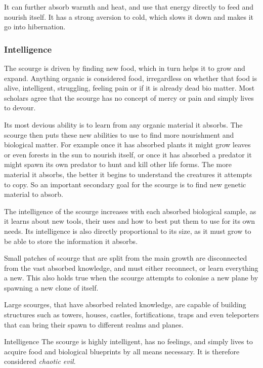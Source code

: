 It can further absorb warmth and heat, and use that energy directly to feed
and nourish itself. It has a strong aversion to cold, which slows it down
and makes it go into hibernation.

\subsubsection{Intelligence}

The scourge is driven by finding new food, which in turn helps it to grow and
expand. Anything organic is considered food, irregardless on whether that food
is alive, intelligent, struggling, feeling pain or if it is already dead bio
matter. Most scholars agree that the scourge has no concept of mercy or pain
and simply lives to devour.

Its most devious ability is to learn from any organic material it absorbs. The
scourge then puts these new abilities to use to find more nourishment and
biological matter. For example once it has absorbed plants it might grow
leaves or even forests in the sun to nourish itself, or once it has absorbed a
predator it might spawn its own predator to hunt and kill other life
forms. The more material it absorbs, the better it begins to understand the
creatures it attempts to copy. So an important secondary goal for the scourge
is to find new genetic material to absorb.

The intelligence of the scourge increases with each absorbed biological
sample, as it learns about new tools, their uses and how to best put them to
use for its own needs. Its intelligence is also directly proportional to its
size, as it must grow to be able to store the information it absorbs.

Small patches of scourge that are split from the main growth are disconnected
from the vast absorbed knowledge, and must either reconnect, or learn
everything a new. This also holds true when the scourge attempts to colonise
a new plane by spawning a new clone of itself.

Large scourges, that have absorbed related knowledge, are capable of building
structures such as towers, houses, castles, fortifications, traps and even
teleporters that can bring their spawn to different realms and planes.

\begin{35e}{Intelligence}
  The scourge is highly intelligent, has no feelings, and simply lives to
  acquire food and biological blueprints by all means necessary. It is therefore
  considered \emph{chaotic evil}.
\end{35e}

